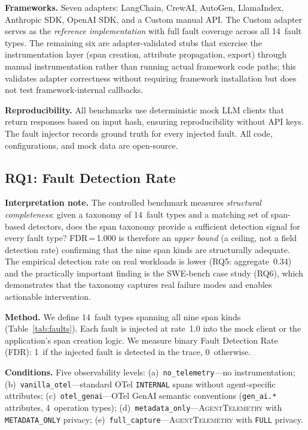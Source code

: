 \documentclass[sigplan,10pt,screen]{acmart}
\begin{document}
\textbf{Frameworks.}  Seven adapters: LangChain, CrewAI, AutoGen,
LlamaIndex, Anthropic SDK, OpenAI SDK, and a Custom manual API.
The Custom adapter serves as the \emph{reference implementation} with
full fault coverage across all 14~fault types.  The remaining six are
adapter-validated stubs that exercise the instrumentation layer
(span creation, attribute propagation, export) through manual
instrumentation rather than running actual framework code paths; this
validates adapter correctness without requiring framework installation
but does not test framework-internal callbacks.

\textbf{Reproducibility.}  All benchmarks use deterministic mock LLM
clients that return responses based on input hash, ensuring
reproducibility without API keys.  The fault injector records ground
truth for every injected fault.  All code, configurations, and mock
data are open-source.

\subsection{RQ1: Fault Detection Rate}
\label{sec:rq1}

\noindent\textbf{Interpretation note.}
The controlled benchmark measures \emph{structural completeness}:
given a taxonomy of 14~fault types and a matching set of span-based
detectors, does the span taxonomy provide a sufficient detection signal
for every fault type?  FDR\,=\,1.000 is therefore an \emph{upper bound}
(a ceiling, not a field detection rate) confirming that the nine span
kinds are structurally adequate.  The empirical detection rate on real
workloads is lower (RQ5: aggregate~0.34) and the practically important
finding is the SWE-bench case study (RQ6), which demonstrates that the
taxonomy captures real failure modes and enables actionable intervention.

\textbf{Method.}  We define 14~fault types spanning all nine span kinds
(Table~\ref{tab:faults}).  Each fault is injected at rate~1.0 into the
mock client or the application's span creation logic.  We measure
binary Fault Detection Rate (FDR): 1~if the injected fault is detected
in the trace, 0~otherwise.

\textbf{Conditions.}  Five observability levels:
(a)~\texttt{no\_telemetry}---no instrumentation;
(b)~\texttt{vanilla\_otel}---standard OTel \texttt{INTERNAL} spans
without agent-specific attributes;
(c)~\texttt{otel\_genai}---OTel GenAI semantic conventions
(\texttt{gen\_ai.*} attributes, 4~operation types);
(d)~\texttt{metadata\_only}---\textsc{AgentTelemetry} with
\texttt{METADATA\_ONLY} privacy;
(e)~\texttt{full\_capture}---\textsc{AgentTelemetry} with
\texttt{FULL} privacy.
\end{document}
